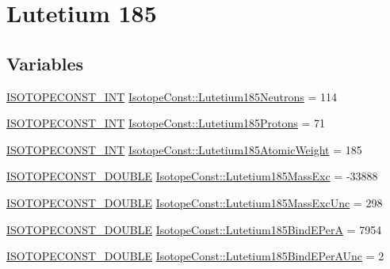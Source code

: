 \hypertarget{group___isotope_const-_lutetium-_lu185}{}\section{Lutetium 185}
\label{group___isotope_const-_lutetium-_lu185}
\subsection*{Variables}
\begin{DoxyCompactItemize}
\item 
\mbox{\hyperlink{group___isotope_const-_macros_ga5f18360b3e99483a35c32d789e62621c}{I\+S\+O\+T\+O\+P\+E\+C\+O\+N\+S\+T\+\_\+\+I\+NT}} \mbox{\hyperlink{group___isotope_const-_lutetium-_lu185_ga43e4aa642bc30e7f8c6ad6841fe12e22}{Isotope\+Const\+::\+Lutetium185\+Neutrons}} = 114
\item 
\mbox{\hyperlink{group___isotope_const-_macros_ga5f18360b3e99483a35c32d789e62621c}{I\+S\+O\+T\+O\+P\+E\+C\+O\+N\+S\+T\+\_\+\+I\+NT}} \mbox{\hyperlink{group___isotope_const-_lutetium-_lu185_ga65ffc3e46054814a6e5275bcaf4b4ede}{Isotope\+Const\+::\+Lutetium185\+Protons}} = 71
\item 
\mbox{\hyperlink{group___isotope_const-_macros_ga5f18360b3e99483a35c32d789e62621c}{I\+S\+O\+T\+O\+P\+E\+C\+O\+N\+S\+T\+\_\+\+I\+NT}} \mbox{\hyperlink{group___isotope_const-_lutetium-_lu185_gaa4743a1104465d4d6bd3fb6ae5e74919}{Isotope\+Const\+::\+Lutetium185\+Atomic\+Weight}} = 185
\item 
\mbox{\hyperlink{group___isotope_const-_macros_ga8f45a7272ce02c0b4c65c44636ed719a}{I\+S\+O\+T\+O\+P\+E\+C\+O\+N\+S\+T\+\_\+\+D\+O\+U\+B\+LE}} \mbox{\hyperlink{group___isotope_const-_lutetium-_lu185_ga1207e0758cbf0ed316cbe5d50d2d703c}{Isotope\+Const\+::\+Lutetium185\+Mass\+Exc}} = -\/33888
\item 
\mbox{\hyperlink{group___isotope_const-_macros_ga8f45a7272ce02c0b4c65c44636ed719a}{I\+S\+O\+T\+O\+P\+E\+C\+O\+N\+S\+T\+\_\+\+D\+O\+U\+B\+LE}} \mbox{\hyperlink{group___isotope_const-_lutetium-_lu185_ga9e9fe8df6a41448ca3312d549c36c3cc}{Isotope\+Const\+::\+Lutetium185\+Mass\+Exc\+Unc}} = 298
\item 
\mbox{\hyperlink{group___isotope_const-_macros_ga8f45a7272ce02c0b4c65c44636ed719a}{I\+S\+O\+T\+O\+P\+E\+C\+O\+N\+S\+T\+\_\+\+D\+O\+U\+B\+LE}} \mbox{\hyperlink{group___isotope_const-_lutetium-_lu185_gaa2c0a233efa738615b1ec4a5663bd9ab}{Isotope\+Const\+::\+Lutetium185\+Bind\+E\+PerA}} = 7954
\item 
\mbox{\hyperlink{group___isotope_const-_macros_ga8f45a7272ce02c0b4c65c44636ed719a}{I\+S\+O\+T\+O\+P\+E\+C\+O\+N\+S\+T\+\_\+\+D\+O\+U\+B\+LE}} \mbox{\hyperlink{group___isotope_const-_lutetium-_lu185_gaa10de1c246d1f52af1594b674eb09128}{Isotope\+Const\+::\+Lutetium185\+Bind\+E\+Per\+A\+Unc}} = 2

\end{DoxyCompactItemize}

